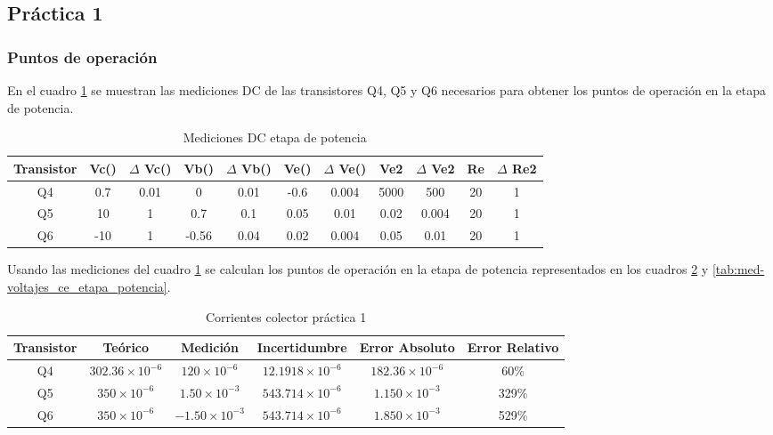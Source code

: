 
\subsection{Práctica 1}

\subsubsection{Puntos de operación}

En el cuadro \ref{tab:med-puntos-dc-etapa-potencia} se muestran las mediciones DC de las transistores Q4, Q5 y Q6 necesarios para obtener los puntos de operación en la etapa de potencia. 

\begin{table}[ht]
\centering
\begin{tabular}{|c|c|c|c|c|c|c|c|c|c|c|}
\hline
\textbf{Transistor} & \textbf{Vc()} & \textbf{$\varDelta$ Vc()} & \textbf{Vb()} & \textbf{$\varDelta$ Vb()} & \textbf{Ve()} & \textbf{$\varDelta$ Ve()} & \textbf{Ve2} & \textbf{$\varDelta$ Ve2} & \textbf{Re} & \textbf{$\varDelta$ Re2} \\ \hline
Q4 & 0.7 & 0.01 & 0 & 0.01 & -0.6 & 0.004 & 5000 & 500 & 20 & 1 \\
\hline
Q5 & 10 & 1 & 0.7 & 0.1 & 0.05 & 0.01 & 0.02 & 0.004 & 20 & 1 \\ \hline
Q6 & -10 & 1 & -0.56 & 0.04 & 0.02 & 0.004 & 0.05 & 0.01 & 20 & 1 \\ \hline
\end{tabular}
\caption{Mediciones DC etapa de potencia}
\label{tab:med-puntos-dc-etapa-potencia}
\end{table}

Usando las mediciones del cuadro \ref{tab:med-puntos-dc-etapa-potencia} se calculan los puntos de operación en la etapa de potencia representados en los cuadros \ref{tab:ic-practica-1} y \ref{tab:med-voltajes_ce_etapa_potencia}.

\begin{table}[ht]
\centering
\begin{tabular}{|c|c|c|c|c|c|}
\hline
Transistor & Teórico & Medición & Incertidumbre & Error Absoluto & Error Relativo \\\hline
Q4 & $302.36 \times 10^{-6}$ & $120 \times 10^{-6}$ & $12.1918 \times 10^{-6}$ & $182.36 \times 10^{-6}$ & 60\% \\\hline
Q5 & $350 \times 10^{-6}$ & $1.50 \times 10^{-3}$ & $543.714 \times 10^{-6}$ & $1.150 \times 10^{-3}$ & 329\% \\\hline
Q6 & $350 \times 10^{-6}$ & $-1.50 \times 10^{-3}$ & $543.714 \times 10^{-6}$ & $1.850 \times 10^{-3}$ & 529\% \\\hline
\end{tabular}
\caption{Corrientes colector práctica 1}
\label{tab:ic-practica-1}
\end{table}

